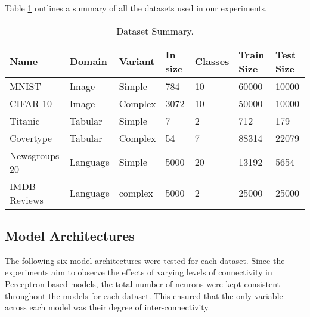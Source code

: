 Table \ref{tab:dataSummary} outlines a summary of all the datasets used in our experiments.


\begin{table}[h!]
  \centering
    \caption{Dataset Summary.}
   \begin{tabular}{|l|l|l|l|l|l|l|}
    \hline
    \textbf{Name} & \textbf{Domain} & \textbf{Variant} & \textbf{In size} & \textbf{Classes} & \textbf{Train Size} & \textbf{Test Size} \\
    \hline
    MNIST & Image & Simple & 784 & 10 & 60000 & 10000 \\
    CIFAR 10 & Image & Complex & 3072 & 10 & 50000 & 10000 \\
    Titanic & Tabular & Simple & 7 & 2 & 712 & 179 \\
    Covertype & Tabular & Complex & 54 & 7 & 88314 & 22079 \\
    Newsgroups 20 & Language & Simple & 5000 & 20 & 13192 & 5654 \\
    IMDB Reviews & Language & complex & 5000 & 2 & 25000 & 25000 \\
    \hline
  \end{tabular}

  \label{tab:dataSummary}
\end{table}


\subsection{Model Architectures}
The following six model architectures were tested for each dataset. Since the experiments aim to observe the effects of varying levels of connectivity in Perceptron-based models, the total number of neurons were kept consistent throughout the models for each dataset. This ensured that the only variable across each model was their degree of inter-connectivity.

